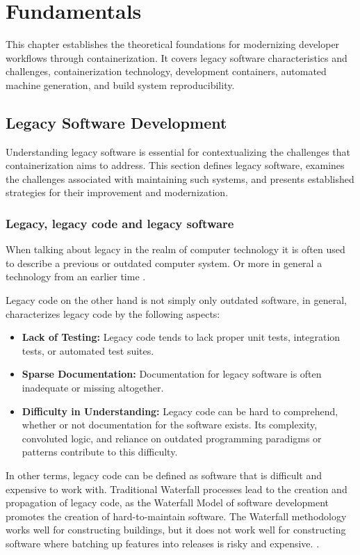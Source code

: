 \chapter{Fundamentals}
\label{ch:fundamentals}

This chapter establishes the theoretical foundations for modernizing developer workflows through containerization.
It covers legacy software characteristics and challenges, containerization technology, development containers, automated machine generation, and build system reproducibility.

\section{Legacy Software Development}
Understanding legacy software is essential for contextualizing the challenges that containerization aims to address.
This section defines legacy software, examines the challenges associated with maintaining such systems, and presents established strategies for their improvement and modernization.

\subsection{Legacy, legacy code and legacy software}
When talking about legacy in the realm of computer technology it is often used to describe a previous or outdated computer system.
Or more in general a technology from an earlier time \citep{Legacy}.

Legacy code on the other hand is not simply only outdated software, in general, \citet{feathersWorkingEffectivelyLegacy2004} characterizes legacy code by the following aspects:
\begin{itemize}
    \item \textbf{Lack of Testing:} Legacy code tends to lack proper unit tests, integration tests, or automated test suites.
    \item \textbf{Sparse Documentation:} Documentation for legacy software is often inadequate or missing altogether.
    \item \textbf{Difficulty in Understanding:} Legacy code can be hard to comprehend, whether or not documentation for the software exists. Its complexity, convoluted logic, and reliance on outdated programming paradigms or patterns contribute to this difficulty.
\end{itemize}

In other terms, legacy code can be defined as software that is difficult and expensive to work with.
Traditional Waterfall processes lead to the creation and propagation of legacy code, as the Waterfall Model of software development promotes the creation of hard-to-maintain software.
The Waterfall methodology works well for constructing buildings, but it does not work well for constructing software where batching up features into releases is risky and expensive.
\citep{bernsteinLegacyCodeNine2015}.

